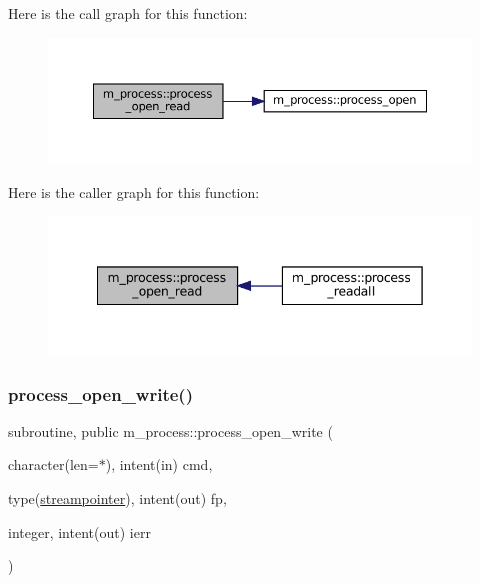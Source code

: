 Here is the call graph for this function\+:
\nopagebreak
\begin{figure}[H]
\begin{center}
\leavevmode
\includegraphics[width=350pt]{namespacem__process_aaaf4d1926258a4cec7da7fc61c38c79d_cgraph}
\end{center}
\end{figure}
Here is the caller graph for this function\+:
\nopagebreak
\begin{figure}[H]
\begin{center}
\leavevmode
\includegraphics[width=342pt]{namespacem__process_aaaf4d1926258a4cec7da7fc61c38c79d_icgraph}
\end{center}
\end{figure}
\mbox{\label{namespacem__process_aa6ed1404ab3472f5068ed15a7a01defc}} 
\subsubsection{\texorpdfstring{process\+\_\+open\+\_\+write()}{process\_open\_write()}}
{\footnotesize\ttfamily subroutine, public m\+\_\+process\+::process\+\_\+open\+\_\+write (\begin{DoxyParamCaption}\item[{character(len=$\ast$), intent(in)}]{cmd,  }\item[{type(\mbox{\hyperlink{structm__process_1_1streampointer}{streampointer}}), intent(out)}]{fp,  }\item[{integer, intent(out)}]{ierr }\end{DoxyParamCaption})}



